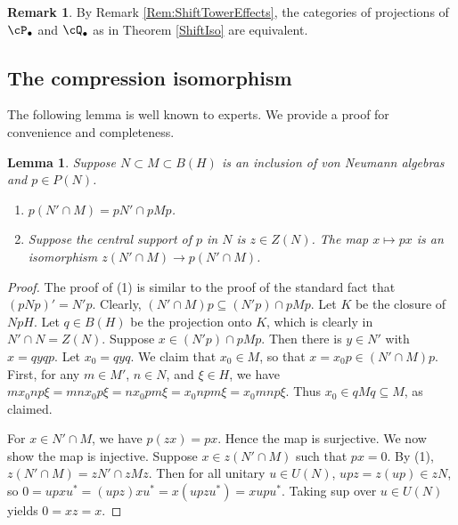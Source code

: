 \documentclass[11pt]{article}
\theoremstyle{plain}
\newtheorem{lem}[thm]{Lemma}
\theoremstyle{definition}
\newtheorem{rem}[thm]{Remark}
\begin{document}
\begin{rem}
By Remark \ref{Rem:ShiftTowerEffects}, the categories of projections of $\cP_\bullet$ and $\cQ_\bullet$ as in Theorem \ref{ShiftIso} are equivalent.
\end{rem}

\subsection{The compression isomorphism}
\label{sec:CompressionIso}

The following lemma is well known to experts. 
We provide a proof for convenience and completeness.

\begin{lem}
\label{lem:CompressRelativeCommutant}
Suppose $N\subset M\subset B(H)$ is an inclusion of von Neumann algebras and $p\in P(N)$.
\begin{enumerate}[label={\rm(\arabic*)}]
\item
$p(N'\cap M) = pN' \cap pMp$.
\item
Suppose the central support of $p$ in $N$ is $z\in Z(N)$.
The map $x\mapsto px$ is an isomorphism $z(N'\cap M) \to p(N'\cap M)$.
\end{enumerate}
\end{lem}
\begin{proof}
\mbox{}
\item[\underline{Proof of (1):}]
The proof of (1) is similar to the proof of the standard fact that $(pNp)' = N'p$.
Clearly, $(N'\cap M)p \subseteq (N'p) \cap pMp$.
Let $K$ be the closure of $NpH$.
Let $q\in B(H)$ be the projection onto $K$, which is clearly in $N' \cap N = Z(N)$.
Suppose $x\in(N'p) \cap pMp$.
Then there is $y\in  N'$ with $x=qyqp$.
Let $x_0=qyq$.
We claim that $x_0 \in M$, so that $x = x_0p \in (N' \cap M)p$.
First, for any $m \in M'$, $n \in N$, and $\xi\in H$,
we have
$mx_0np\xi  = mnx_0p\xi = nx_0pm\xi = x_0npm\xi = x_0mnp\xi$.
Thus $x_0 \in qMq \subseteq M$, as claimed.

\item[\underline{Proof of (2):}]
For $x\in N'\cap M$, we have $p(zx) = px$.
Hence the map is surjective.
We now show the map is injective.
Suppose $x \in z(N'\cap M)$ such that $px = 0$.
By (1), $z(N'\cap M) = zN' \cap zMz$.
Then for all unitary $u\in U(N)$, $upz = z(up) \in zN$, so 
$0 = upxu^* = (upz)xu^* = x(upzu^*) = xupu^*$.
Taking sup over $u \in U(N)$ yields $0 = xz = x$.
\end{proof}
\end{document}
